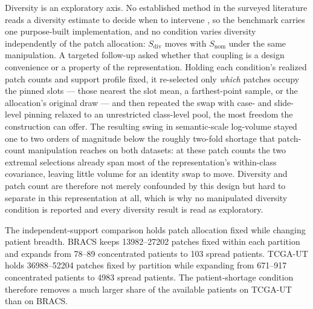 \documentclass[11pt]{article}
\newcommand{\resultstable}[1]{}
\begin{document}
Diversity is an exploratory axis. No established method in the surveyed literature reads a diversity estimate to decide when to intervene \citep{queisler2026imbalanceMethods}, so the benchmark carries one purpose-built implementation, and no condition varies diversity independently of the patch allocation: $S_{\mathrm{div}}$ moves with $S_{\mathrm{nom}}$ under the same manipulation. A targeted follow-up asked whether that coupling is a design convenience or a property of the representation. Holding each condition's realized patch counts and support profile fixed, it re-selected only \emph{which} patches occupy the pinned slots --- those nearest the slot mean, a farthest-point sample, or the allocation's original draw --- and then repeated the swap with case- and slide-level pinning relaxed to an unrestricted class-level pool, the most freedom the construction can offer. The resulting swing in semantic-scale log-volume stayed one to two orders of magnitude below the roughly two-fold shortage that patch-count manipulation reaches on both datasets: at these patch counts the two extremal selections already span most of the representation's within-class covariance, leaving little volume for an identity swap to move. Diversity and patch count are therefore not merely confounded by this design but hard to separate in this representation at all, which is why no manipulated diversity condition is reported and every diversity result is read as exploratory.

\begin{table}[ht]
  \centering
  \scriptsize
  \setlength{\tabcolsep}{3pt}
  \resultstable{signal_profiles}
  \caption{Realized shortages for the four comparisons. Shortage scores $S$ are standardized within each dataset; negative values mean below-average shortage. $A$ is the unstandardized support--difficulty correlation. Dominance compares eligible signed scores, including standardized $-A$, with a \num{0.25}-standard-deviation ambiguity margin.}
  \label{tab:signal-profiles}
\end{table}

\noindent The independent-support comparison holds patch allocation fixed while changing patient breadth. BRACS keeps \num{13982}--\num{27202} patches fixed within each partition and expands from \num{78}--\num{89} concentrated patients to \num{103} spread patients. TCGA-UT holds \num{36988}--\num{52204} patches fixed by partition while expanding from \num{671}--\num{917} concentrated patients to \num{4983} spread patients. The patient-shortage condition therefore removes a much larger share of the available patients on TCGA-UT than on BRACS.
\end{document}
